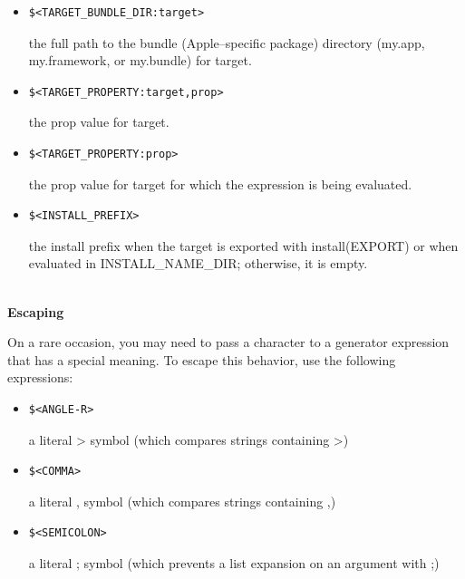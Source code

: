 \begin{itemize}
\item 
\begin{lstlisting}[style=styleCMake]
$<TARGET_BUNDLE_DIR:target> 
\end{lstlisting}

the full path to the bundle (Apple–specific package) directory (my.app, my.framework, or my.bundle) for target.

\item 
\begin{lstlisting}[style=styleCMake]
$<TARGET_PROPERTY:target,prop>
\end{lstlisting}

the prop value for target.

\item 
\begin{lstlisting}[style=styleCMake]
$<TARGET_PROPERTY:prop>
\end{lstlisting}

the prop value for target for which the expression is being evaluated.

\item 
\begin{lstlisting}[style=styleCMake]
$<INSTALL_PREFIX> 
\end{lstlisting}

the install prefix when the target is exported with install(EXPORT) or when evaluated in INSTALL\_NAME\_DIR; otherwise, it is empty.

\end{itemize}

\hspace*{\fill} \\ %
\noindent
\textbf{Escaping}

On a rare occasion, you may need to pass a character to a generator expression that has a special meaning. To escape this behavior, use the following expressions:

\begin{itemize}
\item 
\begin{lstlisting}[style=styleCMake]
$<ANGLE-R>
\end{lstlisting}

a literal > symbol (which compares strings containing >)

\item 
\begin{lstlisting}[style=styleCMake]
$<COMMA>
\end{lstlisting}

a literal , symbol (which compares strings containing ,)

\item 
\begin{lstlisting}[style=styleCMake]
$<SEMICOLON>
\end{lstlisting}

a literal ; symbol (which prevents a list expansion on an argument with ;)
\end{itemize}

